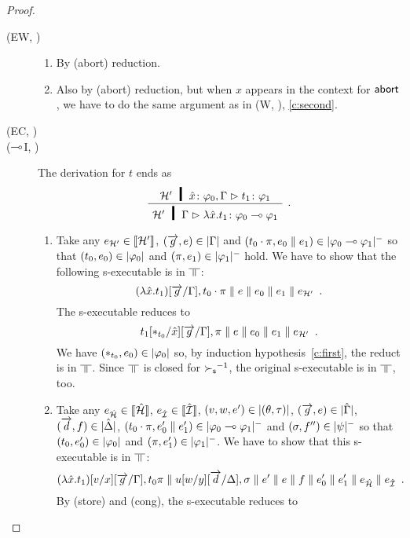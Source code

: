 \begin{proof}
\begin{description}
   \item[(EW, \textminus)]
	\begin{enumerate}[label=\textit{(\arabic{*})}]
	 \item  By (abort) reduction.
	 \item Also by (abort) reduction, but when $x$ appears in the
	       context for $\mathsf{abort\,}$, we have to do the same argument as
	       in (W, \textminus), \ref{c:second}.
	\end{enumerate}
   \item[(EC, \textminus)]
   \item[($\multimap$I, \textminus)]
	The derivation for $t$ ends as
	\[
	\aseq{\hyp'\tj{\hat x}{\phi_0},\G}{\tj{t_1}{\phi_1}}
	\useq{\hyp'\G}{\tj{\lambda{\hat{x}}.t_1}{\phi_0\limp\phi_1}}
	\DisplayProof\enspace.
	\]
	\begin{enumerate}[label=\textit{(\arabic{*})}]
	 \item Take any
	       $e_{\mathcal H'}\in \llbracket{\mathcal H'}\rrbracket$,
	       $(\overrightarrow g, e)\in|{\Gamma}|$
	       and
	       $(t_0\cdot\pi,e_0\parallel e_1)\in|{\varphi_0\multimap\varphi_1}|^-$
	       so that $(t_0,e_0)\in|{\varphi_0}|$ and
	       $(\pi,e_1)\in|{\varphi_1}|^-$ hold.
	       We have to show that the following s-executable is in
	       $\bbot$:
	       \[
	       (\lambda\hat x.t_1)[\overrightarrow g/\Gamma],
	       t_0\cdot\pi\parallel e\parallel e_0\parallel e_1\parallel e_{\mathcal
	       H'}\enspace.
	       \]
	       The s-executable reduces to
	       \[
		t_1[\ast_{t_0}/\hat x][\overrightarrow{g}/\Gamma],\pi\parallel{e}\parallel
	       e_0\parallel{e_1}\parallel e_{\mathcal H'}\enspace.
	       \]
	       We have $(\ast_{t_0}, e_0)\in|{\varphi_0}|$ so, by
	       induction hypothesis~\ref{c:first},
	       the reduct is in $\bbot$.
	       Since $\bbot$ is closed for ${\succ_{\mathsf s}}^{-1}$, the original
	       s-executable is in $\bbot$, too.
	 \item Take any
	       $e_{\hat{\mathcal{H}}}\in \llbracket{\hat{\mathcal{H}}}\rrbracket$,
	       $e_{\hat{\mathcal{I}}}\in \llbracket{\hat{\mathcal{I}}}\rrbracket$,
	       $(v,w,e')\in|{(\theta,\tau)}|$,
	       $(\overrightarrow g, e)\in|{\hat{\Gamma}}|$,
	       $(\overrightarrow d, f)\in|{\hat{\Delta}}|$,
	       $(t_0\cdot\pi,e_0'\parallel e_1')\in|{\varphi_0\multimap\varphi_1}|^-$ and
	       $(\sigma,f'')\in|{\psi}|^-$ so that
	       $(t_0,e_0')\in|{\varphi_0}|$ and
	       $(\pi,e_1')\in|{\varphi_1}|^-$.
	       We have to show that this s-executable is in $\bbot$:
	       \[
	       (\lambda \hat x. t_1)[v/x][\overrightarrow{g}/\Gamma],t_0\pi\parallel
	       u[w/y][\overrightarrow{d}/\Delta],\sigma\parallel
	       e'\parallel {e}\parallel {f} \parallel{e_0'}\parallel{e_1'}\parallel
	       e_{\hat{\mathcal{H}}}\parallel e_{\hat{\mathcal{I}}}\enspace.
	       \]
	       By (store) and (cong), the s-executable reduces to

\end{enumerate}
\end{description}
\end{proof}

